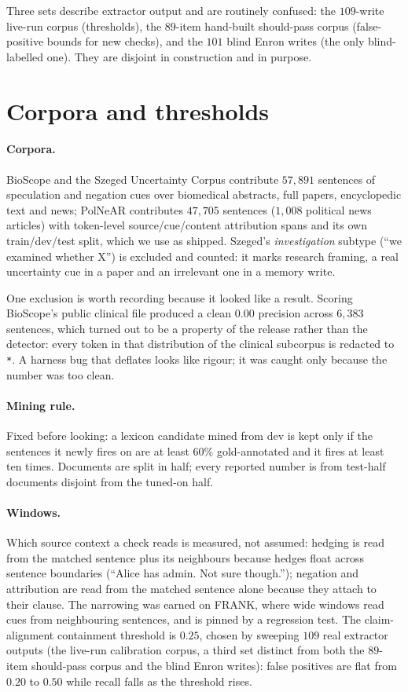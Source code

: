\documentclass[11pt]{article}
\begin{document}
Three sets describe extractor output and are routinely confused: the $109$-write
live-run corpus (thresholds), the $89$-item hand-built should-pass corpus (false-positive
bounds for new checks), and the $101$ blind Enron writes (the only blind-labelled one).
They are disjoint in construction and in purpose.

\section{Corpora and thresholds}
\label{app:corpora}

\paragraph{Corpora.} BioScope and the Szeged Uncertainty Corpus contribute $57{,}891$
sentences of speculation and negation cues over biomedical abstracts, full papers,
encyclopedic text and news; PolNeAR contributes $47{,}705$ sentences ($1{,}008$
political news articles) with token-level source/cue/content attribution spans and its
own train/dev/test split, which we use as shipped. Szeged's \emph{investigation} subtype
(``we examined whether X'') is excluded and counted: it marks research framing, a real
uncertainty cue in a paper and an irrelevant one in a memory write.

One exclusion is worth recording because it looked like a result. Scoring BioScope's
public clinical file produced a clean $0.00$ precision across $6{,}383$ sentences, which
turned out to be a property of the release rather than the detector: every token in that
distribution of the clinical subcorpus is redacted to \texttt{*}. A harness bug that
deflates looks like rigour; it was caught only because the number was too clean.

\paragraph{Mining rule.} Fixed before looking: a lexicon candidate mined from dev is
kept only if the sentences it newly fires on are at least $60\%$ gold-annotated and it
fires at least ten times. Documents are split in half; every reported number is from
test-half documents disjoint from the tuned-on half.

\paragraph{Windows.} Which source context a check reads is measured, not assumed:
hedging is read from the matched sentence plus its neighbours because hedges float
across sentence boundaries (``Alice has admin. Not sure though.''); negation and
attribution are read from the matched sentence alone because they attach to their
clause. The narrowing was earned on FRANK, where wide windows read cues from
neighbouring sentences, and is pinned by a regression test. The claim-alignment
containment threshold is $0.25$, chosen by sweeping $109$ real extractor outputs (the
live-run calibration corpus, a third set distinct from both the $89$-item should-pass
corpus and the blind Enron writes): false positives are flat from $0.20$ to $0.50$
while recall falls as the threshold rises.
\end{document}
